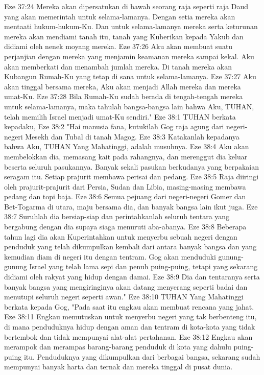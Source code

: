 Eze 37:24  Mereka akan dipersatukan di bawah seorang raja seperti raja Daud yang akan memerintah untuk selama-lamanya. Dengan setia mereka akan mentaati hukum-hukum-Ku. Dan untuk selama-lamanya mereka serta keturunan mereka akan mendiami tanah itu, tanah yang Kuberikan kepada Yakub dan didiami oleh nenek moyang mereka.
Eze 37:26  Aku akan membuat suatu perjanjian dengan mereka yang menjamin keamanan mereka sampai kekal. Aku akan memberkati dan menambah jumlah mereka. Di tanah mereka akan Kubangun Rumah-Ku yang tetap di sana untuk selama-lamanya.
Eze 37:27  Aku akan tinggal bersama mereka, Aku akan menjadi Allah mereka dan mereka umat-Ku.
Eze 37:28  Bila Rumah-Ku sudah berada di tengah-tengah mereka untuk selama-lamanya, maka tahulah bangsa-bangsa lain bahwa Aku, TUHAN, telah memilih Israel menjadi umat-Ku sendiri."
Eze 38:1  TUHAN berkata kepadaku,
Eze 38:2  "Hai manusia fana, kutukilah Gog raja agung dari negeri-negeri Mesekh dan Tubal di tanah Magog.
Eze 38:3  Katakanlah kepadanya bahwa Aku, TUHAN Yang Mahatinggi, adalah musuhnya.
Eze 38:4  Aku akan membelokkan dia, memasang kait pada rahangnya, dan merenggut dia keluar beserta seluruh pasukannya. Banyak sekali pasukan berkudanya yang berpakaian seragam itu. Setiap prajurit membawa perisai dan pedang.
Eze 38:5  Raja diiringi oleh prajurit-prajurit dari Persia, Sudan dan Libia, masing-masing membawa pedang dan topi baja.
Eze 38:6  Semua pejuang dari negeri-negeri Gomer dan Bet-Togarma di utara, maju bersama dia, dan banyak bangsa lain ikut juga.
Eze 38:7  Suruhlah dia bersiap-siap dan perintahkanlah seluruh tentara yang bergabung dengan dia supaya siaga menuruti aba-abanya.
Eze 38:8  Beberapa tahun lagi dia akan Kuperintahkan untuk menyerbu sebuah negeri dengan penduduk yang telah dikumpulkan kembali dari antara banyak bangsa dan yang kemudian diam di negeri itu dengan tentram. Gog akan menduduki gunung-gunung Israel yang telah lama sepi dan penuh puing-puing, tetapi yang sekarang didiami oleh rakyat yang hidup dengan damai.
Eze 38:9  Dia dan tentaranya serta banyak bangsa yang mengiringinya akan datang menyerang seperti badai dan menutupi seluruh negeri seperti awan."
Eze 38:10  TUHAN Yang Mahatinggi berkata kepada Gog, "Pada saat itu engkau akan membuat rencana yang jahat.
Eze 38:11  Engkau memutuskan untuk menyerbu negeri yang tak berbenteng itu, di mana penduduknya hidup dengan aman dan tentram di kota-kota yang tidak bertembok dan tidak mempunyai alat-alat pertahanan.
Eze 38:12  Engkau akan merampok dan merampas barang-barang penduduk di kota yang dahulu puing-puing itu. Penduduknya yang dikumpulkan dari berbagai bangsa, sekarang sudah mempunyai banyak harta dan ternak dan mereka tinggal di pusat dunia.
